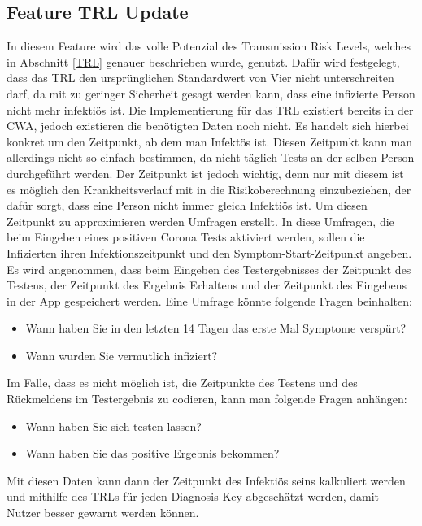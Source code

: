 \documentclass[conference,compsoc]{IEEEtran}
\begin{document}
\subsection{Feature TRL Update}
\label{Feature TRL Update}
In diesem Feature wird das volle Potenzial des Transmission Risk Levels, welches in Abschnitt \ref{TRL} genauer beschrieben wurde, genutzt. 
Dafür wird festgelegt, dass das TRL den ursprünglichen Standardwert von Vier nicht unterschreiten darf,
da mit zu geringer Sicherheit gesagt werden kann, dass eine infizierte Person nicht mehr infektiös ist. 
Die Implementierung für das TRL existiert bereits in der CWA, jedoch existieren die benötigten Daten noch nicht.
Es handelt sich hierbei konkret um den Zeitpunkt, ab dem man Infektös ist. 
Diesen Zeitpunkt kann man allerdings nicht so einfach bestimmen, da nicht täglich Tests an der selben Person durchgeführt werden.
Der Zeitpunkt ist jedoch wichtig, denn nur mit diesem ist es möglich den Krankheitsverlauf mit in die Risikoberechnung einzubeziehen,
der dafür sorgt, dass eine Person nicht immer gleich Infektiös ist. 
Um diesen Zeitpunkt zu approximieren werden Umfragen erstellt.  
In diese Umfragen, die beim Eingeben eines positiven Corona Tests aktiviert werden, sollen die Infizierten ihren Infektionszeitpunkt und den Symptom-Start-Zeitpunkt angeben. 
Es wird angenommen, dass beim Eingeben des Testergebnisses der Zeitpunkt des Testens, 
der Zeitpunkt des Ergebnis Erhaltens und der Zeitpunkt des Eingebens in der App gespeichert werden. 
Eine Umfrage könnte folgende Fragen beinhalten:

\begin{itemize}
	\item Wann haben Sie in den letzten 14 Tagen das erste Mal Symptome verspürt?
	\item Wann wurden Sie vermutlich infiziert?
\end{itemize}

Im Falle, dass es nicht möglich ist, die Zeitpunkte des Testens und des Rückmeldens im Testergebnis zu codieren, kann man folgende Fragen anhängen:

\begin{itemize}
	\item Wann haben Sie sich testen lassen?
	\item Wann haben Sie das positive Ergebnis bekommen?
\end{itemize} 
	
Mit diesen Daten kann dann der Zeitpunkt des Infektiös seins kalkuliert werden und mithilfe des TRLs für jeden Diagnosis Key abgeschätzt werden,
damit Nutzer besser gewarnt werden können.
\end{document}
